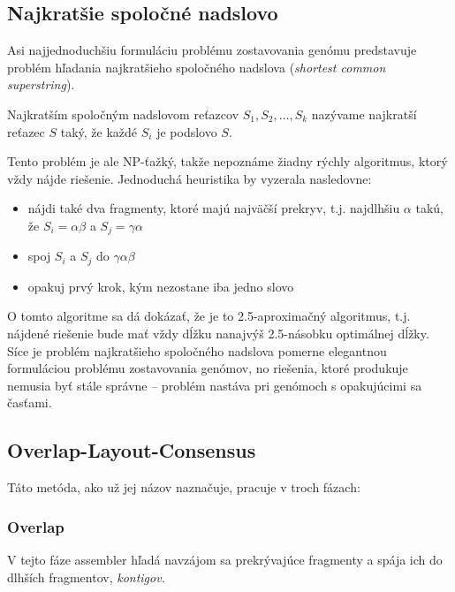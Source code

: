     \subsection{Najkratšie spoločné nadslovo}
    Asi najjednoduchšiu formuláciu problému zostavovania genómu predstavuje
    problém hľadania najkratšieho spoločného nadslova (\emph{shortest common
    superstring}).
    
    \begin{defn}
        Najkratším spoločným nadslovom reťazcov $S_1, S_2, \ldots, S_k$ nazývame
        najkratší reťazec $S$ taký, že každé $S_i$ je podslovo $S$.
    \end{defn}
    
    Tento problém je ale NP-ťažký\cite{GJ02}, takže nepoznáme žiadny rýchly algoritmus,
    ktorý vždy nájde riešenie. Jednoduchá heuristika by vyzerala nasledovne:
    
    \begin{itemize}
        \item nájdi také dva fragmenty, ktoré majú najväčší prekryv, t.j.
        najdlhšiu $\alpha$ takú, že $S_i = \alpha\beta$ a $S_j = \gamma\alpha$
        \item spoj $S_i$ a $S_j$ do $\gamma\alpha\beta$
        \item opakuj prvý krok, kým nezostane iba jedno slovo
    \end{itemize}
    
    O tomto algoritme sa dá dokázať, že je to 2.5-aproximačný algoritmus\cite{ZS00}, t.j.
    nájdené riešenie bude mať vždy dĺžku nanajvýš 2.5-násobku optimálnej dĺžky.
    Síce je problém najkratšieho spoločného nadslova pomerne elegantnou
    formuláciou problému zostavovania genómov, no riešenia, ktoré produkuje nemusia byť stále správne -- problém nastáva pri genómoch s opakujúcimi sa časťami.

    \subsection{Overlap-Layout-Consensus}
    Táto metóda, ako už jej názov naznačuje, pracuje v troch fázach:
    
    \subsubsection{Overlap}
    V tejto fáze assembler hľadá navzájom sa prekrývajúce fragmenty a spája ich do dlhších fragmentov, \emph{kontigov}. 
    
